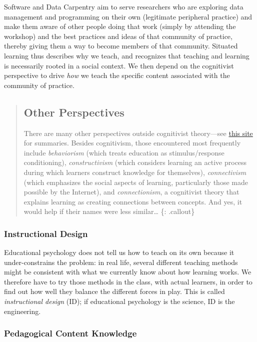 Software and Data Carpentry aim to serve researchers who are exploring
data management and programming on their own (legitimate peripheral
practice) and make them aware of other people doing that work (simply by
attending the workshop) and the best practices and ideas of that
community of practice, thereby giving them a way to become members of
that community. Situated learning thus describes why we teach, and
recognizes that teaching and learning is necessarily rooted in a social
context. We then depend on the cognitivist perspective to drive
\emph{how} we teach the specific content associated with the community
of practice.

\begin{quote}
\subsection{Other Perspectives}\label{other-perspectives}

There are many other perspectives outside cognitivist theory---see
\href{http://www.learning-theories.com/}{this site} for summaries.
Besides cognitivism, those encountered most frequently include
\emph{behaviorism} (which treats education as stimulus/response
conditioning), \emph{constructivism} (which considers learning an active
process during which learners construct knowledge for themselves),
\emph{connectivism} (which emphasizes the social aspects of learning,
particularly those made possible by the Internet), and
\emph{connectionism}, a cognitivist theory that explains learning as
creating connections between concepts. And yes, it would help if their
names were less similar\ldots{} \{: .callout\}
\end{quote}

\subsubsection{Instructional Design}\label{instructional-design}

Educational psychology does not tell us how to teach on its own because
it under-constrains the problem: in real life, several different
teaching methods might be consistent with what we currently know about
how learning works. We therefore have to try those methods in the class,
with actual learners, in order to find out how well they balance the
different forces in play. This is called \emph{instructional design}
(ID); if educational psychology is the science, ID is the engineering.

\subsubsection{Pedagogical Content
Knowledge}\label{pedagogical-content-knowledge}

